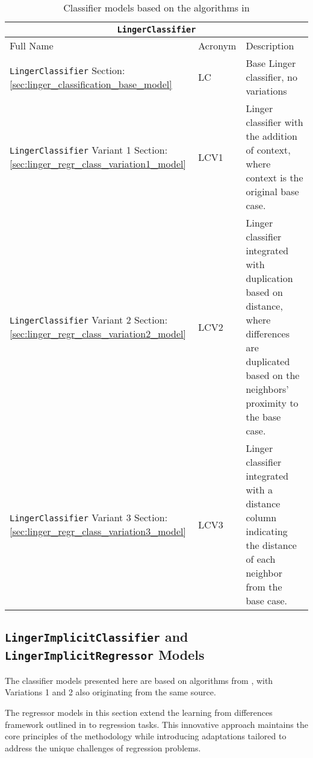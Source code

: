 \documentclass[a4paper, 12pt]{report}
\begin{document}
\begin{table}[H]
    \centering
    \begin{tabular}{ |p{6cm}|p{2cm}|p{9cm}| }
        \hline
        \multicolumn{3}{|c|}{\texttt{LingerClassifier}} \\
        \hline
        \hline
        Full Name & Acronym & Description \\
        \hline
        \texttt{LingerClassifier}  Section: \ref{sec:linger_classification_base_model} & LC & Base Linger classifier, no variations \\
        \hline
        \texttt{LingerClassifier} Variant 1 Section: \ref{sec:linger_regr_class_variation1_model} & LCV1 & Linger classifier with the addition of context, where context is the original base case. \\
        \hline
        \texttt{LingerClassifier} Variant 2 Section: \ref{sec:linger_regr_class_variation2_model} & LCV2 & Linger classifier integrated with duplication based on distance, where differences are duplicated based on the neighbors' proximity to the base case. \\
        \hline
        \texttt{LingerClassifier} Variant 3 Section: \ref{sec:linger_regr_class_variation3_model} & LCV3 & Linger classifier integrated with a distance column indicating the distance of each neighbor from the base case. \\
        \hline
    \end{tabular}
    \caption{Classifier models based on the algorithms in \cite{learningFromDifferences2022}}
    \label{tab:LingerClassifier_models}
\end{table}


\subsection{\texttt{LingerImplicitClassifier} and \texttt{LingerImplicitRegressor} Models}
The classifier models presented here are based on algorithms from \cite{ye2021learning}, with Variations 1 and 2 also originating from the same source.

The regressor models in this section extend the learning from differences framework outlined in \cite{ye2021learning} to regression tasks. 
This innovative approach maintains the core principles of the methodology while introducing adaptations tailored to address the unique challenges of regression problems.
\end{document}
